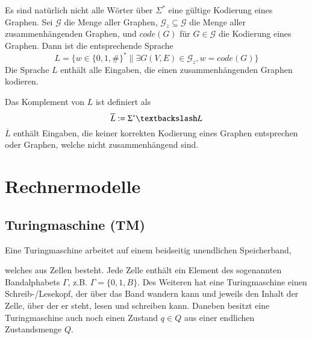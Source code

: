 \par\medskip Es sind natürlich nicht alle Wörter über $\Sigma^*$ eine gültige Kodierung eines Graphen. Sei $\mathcal{G}$ die Menge aller Graphen, $\mathcal{G}_z \subseteq \mathcal{G}$ die Menge aller zusammenhängenden Graphen, und $code(G)$ für $G \in \mathcal{G}$ die Kodierung eines Graphen. Dann ist die entsprechende Sprache $$ L=\{ w \in \{ 0,1,\# \}^* \| \exists G(V,E) \in \mathcal{G}_z, w=code(G) \} $$ Die Sprache $L$ enthält alle Eingaben, die einen zusammenhängenden Graphen kodieren.

\par\medskip Das Komplement von $L$ ist definiert als $$ \overline{L} := \Sigma^* \textbackslash L $$ $\overline{L}$ enthält Eingaben, die keiner korrekten Kodierung eines Graphen entsprechen oder Graphen, welche nicht zusammenhängend sind.


\section{Rechnermodelle}

\subsection{Turingmaschine (TM)}
Eine Turingmaschine arbeitet auf einem beidseitig unendlichen Speicherband,

\begin{center}
\end{center}

welches aus Zellen besteht. Jede Zelle enthält ein Element des sogenannten Bandalphabets $\Gamma$, z.B. $\Gamma=\{ 0,1,B \}$. Des Weiteren hat eine Turingmaschine einen Schreib-/Lesekopf, der über das Band wandern kann und jeweils den Inhalt der Zelle, über der er steht, lesen und schreiben kann. Daneben besitzt eine Turingmaschine auch noch einen Zustand $q \in Q$ aus einer endlichen Zustandsmenge $Q$.

